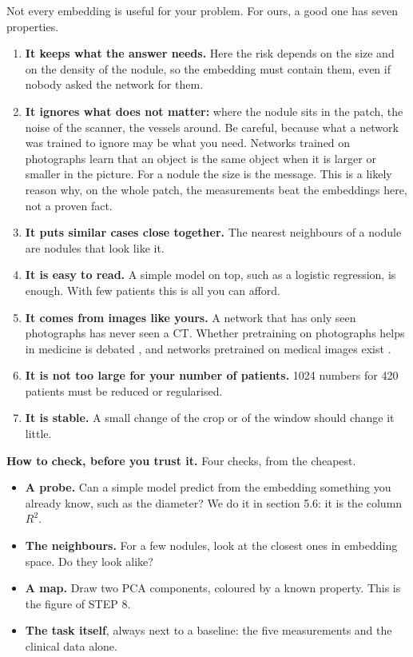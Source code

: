 \documentclass[11pt,a4paper]{article}
\begin{document}
Not every embedding is useful for your problem. For ours, a good one has seven properties.
\begin{enumerate}
\item \textbf{It keeps what the answer needs.} Here the risk depends on the size and on the density of the
nodule, so the embedding must contain them, even if nobody asked the network for them.
\item \textbf{It ignores what does not matter:} where the nodule sits in the patch, the noise of the scanner, the
vessels around. Be careful, because what a network was trained to ignore may be what you need. Networks trained
on photographs learn that an object is the same object when it is larger or smaller in the picture. For a
nodule the size is the message. This is a likely reason why, on the whole patch, the measurements beat the embeddings here, not a proven fact.
\item \textbf{It puts similar cases close together.} The nearest neighbours of a nodule are nodules that look
like it.
\item \textbf{It is easy to read.} A simple model on top, such as a logistic regression, is enough. With few
patients this is all you can afford.
\item \textbf{It comes from images like yours.} A network that has only seen photographs has never seen a CT.
Whether pretraining on photographs helps in medicine is debated \cite{raghu2019transfusion}, and networks
pretrained on medical images exist \cite{mei2022radimagenet}.
\item \textbf{It is not too large for your number of patients.} 1024 numbers for 420 patients must be reduced or
regularised.
\item \textbf{It is stable.} A small change of the crop or of the window should change it little.
\end{enumerate}

\textbf{How to check, before you trust it.} Four checks, from the cheapest.
\begin{itemize}
\item \textbf{A probe.} Can a simple model predict from the embedding something you already know, such as the
diameter? We do it in section 5.6: it is the column $R^2$.
\item \textbf{The neighbours.} For a few nodules, look at the closest ones in embedding space. Do they look alike?
\item \textbf{A map.} Draw two PCA components, coloured by a known property. This is the figure of STEP 8.
\item \textbf{The task itself}, always next to a baseline: the five measurements and the clinical data alone.
\end{itemize}
\end{document}
